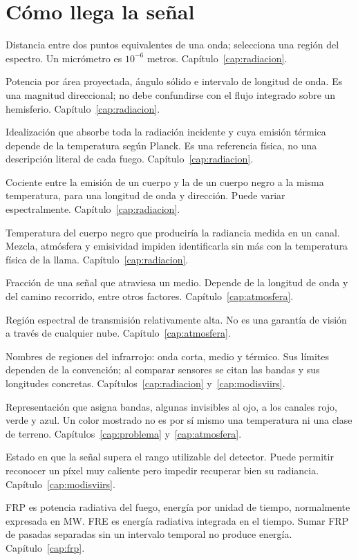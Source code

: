 \section{Cómo llega la señal}
\begin{description}[style=nextline,leftmargin=1.2em]
\item[Longitud de onda.] Distancia entre dos puntos equivalentes de una onda; selecciona
una región del espectro. Un micrómetro es $10^{-6}$ metros. Capítulo~\ref{cap:radiacion}.
\item[Radiancia espectral.] Potencia por área proyectada, ángulo sólido e intervalo de
longitud de onda. Es una magnitud direccional; no debe confundirse con el flujo integrado
sobre un hemisferio. Capítulo~\ref{cap:radiacion}.
\item[Cuerpo negro.] Idealización que absorbe toda la radiación incidente y cuya emisión
térmica depende de la temperatura según Planck. Es una referencia física, no una
descripción literal de cada fuego. Capítulo~\ref{cap:radiacion}.
\item[Emisividad.] Cociente entre la emisión de un cuerpo y la de un cuerpo negro a la
misma temperatura, para una longitud de onda y dirección. Puede variar espectralmente.
Capítulo~\ref{cap:radiacion}.
\item[Temperatura de brillo.] Temperatura del cuerpo negro que produciría la radiancia
medida en un canal. Mezcla, atmósfera y emisividad impiden identificarla sin más con la
temperatura física de la llama. Capítulo~\ref{cap:radiacion}.
\item[Transmitancia.] Fracción de una señal que atraviesa un medio. Depende de la longitud
de onda y del camino recorrido, entre otros factores. Capítulo~\ref{cap:atmosfera}.
\item[Ventana atmosférica.] Región espectral de transmisión relativamente alta. No es
una garantía de visión a través de cualquier nube. Capítulo~\ref{cap:atmosfera}.
\item[SWIR, MIR y TIR.] Nombres de regiones del infrarrojo: onda corta, medio y térmico.
Sus límites dependen de la convención; al comparar sensores se citan las bandas y sus
longitudes concretas. Capítulos~\ref{cap:radiacion} y~\ref{cap:modisviirs}.
\item[Falso color.] Representación que asigna bandas, algunas invisibles al ojo, a los
canales rojo, verde y azul. Un color mostrado no es por sí mismo una temperatura ni una
clase de terreno. Capítulos~\ref{cap:problema} y~\ref{cap:atmosfera}.
\item[Saturación.] Estado en que la señal supera el rango utilizable del detector. Puede
permitir reconocer un píxel muy caliente pero impedir recuperar bien su radiancia.
Capítulo~\ref{cap:modisviirs}.
\item[FRP y FRE.] FRP es potencia radiativa del fuego, energía por unidad de tiempo,
normalmente expresada en MW. FRE es energía radiativa integrada en el tiempo. Sumar FRP
de pasadas separadas sin un intervalo temporal no produce energía. Capítulo~\ref{cap:frp}.
\end{description}

